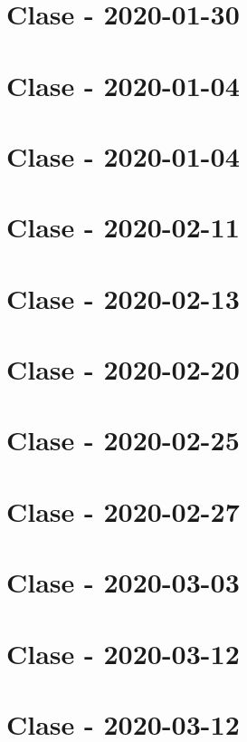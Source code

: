 \documentclass[openany]{book}
\begin{document}
\chapter{Clase - 2020-01-30}


\chapter{Clase - 2020-01-04}


\chapter{Clase - 2020-01-04}


\chapter{Clase - 2020-02-11}


\chapter{Clase - 2020-02-13}


\chapter{Clase - 2020-02-20}


\chapter{Clase - 2020-02-25}


\chapter{Clase - 2020-02-27}


\chapter{Clase - 2020-03-03}



\chapter{Clase - 2020-03-12}


\chapter{Clase - 2020-03-12}

\end{document}
